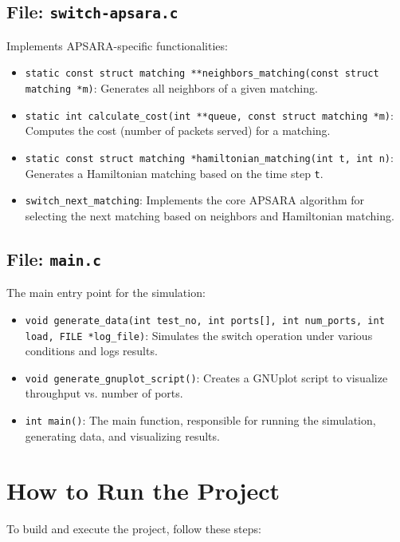 \documentclass[12pt	]{article}
\begin{document}
\subsection{File: \texttt{switch-apsara.c}}
Implements APSARA-specific functionalities:
\begin{itemize}
	\item \texttt{static const struct matching **neighbors\_matching(const struct matching *m)}: Generates all neighbors of a given matching.
	\item \texttt{static int calculate\_cost(int **queue, const struct matching *m)}: Computes the cost (number of packets served) for a matching.
	\item \texttt{static const struct matching *hamiltonian\_matching(int t, int n)}: Generates a Hamiltonian matching based on the time step \texttt{t}.
	\item \texttt{switch\_next\_matching}: Implements the core APSARA algorithm for selecting the next matching based on neighbors and Hamiltonian matching.
\end{itemize}

\subsection{File: \texttt{main.c}}
The main entry point for the simulation:
\begin{itemize}
	\item \texttt{void generate\_data(int test\_no, int ports[], int num\_ports, int load, FILE *log\_file)}: Simulates the switch operation under various conditions and logs results.
	\item \texttt{void generate\_gnuplot\_script()}: Creates a GNUplot script to visualize throughput vs. number of ports.
	\item \texttt{int main()}: The main function, responsible for running the simulation, generating data, and visualizing results.
\end{itemize}




\section{How to Run the Project}

To build and execute the project, follow these steps:
\end{document}
